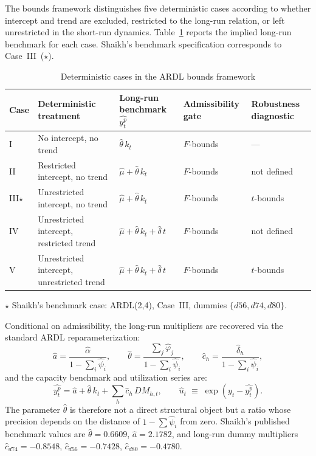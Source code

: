 \documentclass[11pt,a4paper]{article}
\begin{document}
The bounds framework distinguishes five deterministic cases according to
whether intercept and trend are excluded, restricted to the long-run
relation, or left unrestricted in the short-run dynamics.
Table~\ref{tab:pss_cases_yp} reports the implied long-run benchmark for
each case. Shaikh's benchmark specification corresponds to
Case~III~($\star$).

\begin{table}[!ht]
	\centering
	\small
	\caption{Deterministic cases in the ARDL bounds framework}
	\label{tab:pss_cases_yp}
	\begin{tabular}{p{0.8cm}p{3.6cm}p{4.2cm}p{2.0cm}p{2.5cm}}
		\hline\hline
		Case & Deterministic treatment
		& Long-run benchmark $\widehat{y_t^p}$
		& Admissibility gate
		& Robustness diagnostic \\
		\hline
		I   & No intercept, no trend
		& $\widehat{\theta}\,k_t$
		& $F$-bounds & --- \\[2pt]
		II  & Restricted intercept, no trend
		& $\widehat{\mu} + \widehat{\theta}\,k_t$
		& $F$-bounds & not defined \\[2pt]
		III$\star$
		& Unrestricted intercept, no trend
		& $\widehat{\mu} + \widehat{\theta}\,k_t$
		& $F$-bounds & $t$-bounds \\[2pt]
		IV  & Unrestricted intercept, restricted trend
		& $\widehat{\mu} + \widehat{\theta}\,k_t + \widehat{\delta}\,t$
		& $F$-bounds & not defined \\[2pt]
		V   & Unrestricted intercept, unrestricted trend
		& $\widehat{\mu} + \widehat{\theta}\,k_t + \widehat{\delta}\,t$
		& $F$-bounds & $t$-bounds \\
		\hline
	\end{tabular}
	\par\vspace{0.3em}
	\footnotesize $\star$ Shaikh's benchmark case: ARDL(2,4), Case~III,
	dummies $\{d56, d74, d80\}$.
\end{table}

Conditional on admissibility, the long-run multipliers are recovered via the
standard ARDL reparameterization:
%
\begin{equation}
	\label{eq:S0_lrmult}
	\hat{a} = \frac{\hat{\alpha}}{1 - \sum_i \hat{\psi}_i},
	\qquad
	\hat{\theta} = \frac{\sum_j \hat{\varphi}_j}{1 - \sum_i \hat{\psi}_i},
	\qquad
	\hat{c}_h = \frac{\hat{\delta}_h}{1 - \sum_i \hat{\psi}_i},
\end{equation}
%
and the capacity benchmark and utilization series are:
%
\begin{equation}
	\label{eq:S0_yp}
	\widehat{y_t^p}
	=
	\hat{a} + \hat{\theta}\,k_t + \sum_h \hat{c}_h\,DM_{h,t},
	\qquad
	\widehat{u}_t
	\;\equiv\;
	\exp\!\left( y_t - \widehat{y_t^p} \right).
\end{equation}
%
The parameter $\hat{\theta}$ is therefore not a direct structural object but
a ratio whose precision depends on the distance of
$1 - \sum\hat{\psi}_i$ from zero. Shaikh's published benchmark values are
$\hat{\theta} = 0.6609$, $\hat{a} = 2.1782$, and long-run dummy multipliers
$\hat{c}_{d74} = -0.8548$, $\hat{c}_{d56} = -0.7428$,
$\hat{c}_{d80} = -0.4780$.
\end{document}
